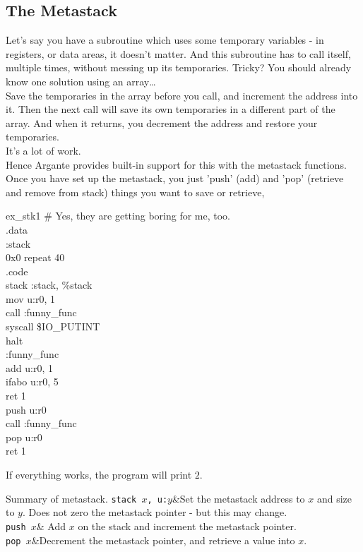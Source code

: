 \documentclass[a4paper,oneside,openany]{book}
\begin{document}
\subsection{The Metastack}
Let's say you have a subroutine which uses some temporary variables - in registers, or data areas,
it doesn't matter. And this subroutine has to call itself, multiple times, without messing up
its temporaries. Tricky? You should already know one solution using an array\ldots\\
Save the temporaries in the array before you call, and increment the address into it.
Then the next call will save its own temporaries in a different part of the array.
And when it returns, you decrement the address and restore your temporaries.\\
It's a lot of work.\\
Hence Argante provides built-in support for this with the metastack functions. Once
you have set up the metastack, you just 'push' (add) and 'pop' (retrieve and remove
from stack) things you want to save or retrieve,
\begin{codefile}{ex\_stk1}
\# Yes, they are getting boring for me, too.\\
.data\\
:stack\\
\>	0x0 repeat 40\\
.code\\
\>	stack :stack, \%stack\\
\>	mov u:r0, 1\\
\>	call :funny\_func\\
\>	syscall \$IO\_PUTINT\\
\>	halt\\
:funny\_func\\
\>	add u:r0, 1\\
\>	ifabo u:r0, 5\\
\>	ret 1\\
\>	push u:r0\\
\>	call :funny\_func\\
\>	pop u:r0\\
\>	ret 1\\
\end{codefile}
If everything works, the program will print $2$.
\begin{codetablefig}{Summary of metastack.}
\texttt{stack $x$, u:$y$}&Set the metastack address to $x$ and size to $y$.
Does not zero the metastack pointer - but this may change. \\
\texttt{push $x$}& Add $x$ on the stack and increment the metastack pointer.\\
\texttt{pop $x$}&Decrement the metastack pointer, and retrieve a value into $x$.\\
\end{codetablefig}
\end{document}
